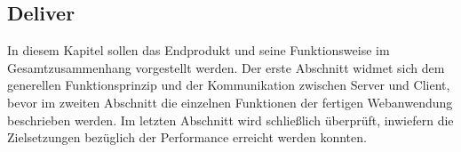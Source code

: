 \begin{newpage}
  \section{Deliver}
  \label{sec:deliver}

    In diesem Kapitel sollen das Endprodukt und seine Funktionsweise im Gesamtzusammenhang vorgestellt werden. Der erste Abschnitt widmet sich dem generellen Funktionsprinzip und der Kommunikation zwischen Server und Client, bevor im zweiten Abschnitt die einzelnen Funktionen der fertigen Webanwendung beschrieben werden. Im letzten Abschnitt wird schließlich überprüft, inwiefern die Zielsetzungen bezüglich der Performance erreicht werden konnten. 
    
    
    
    
\end{newpage}